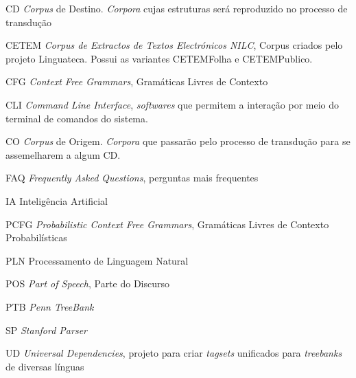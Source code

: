 \begin{siglas}  
    \item [CD] \textit{Corpus} de Destino. \textit{Corpora} cujas estruturas será reproduzido no processo de transdução
    \item[CETEM] \textit{Corpus de Extractos de Textos Electrónicos NILC}, Corpus criados pelo projeto Linguateca. Possui as variantes CETEMFolha e CETEMPublico.
    \item[CFG] \textit{Context Free Grammars}, Gramáticas Livres de Contexto
    \item[CLI] \textit{Command Line Interface}, \textit{softwares} que permitem a interação por meio do terminal de comandos do sistema.
    \item[CO] \textit{Corpus} de Origem. \textit{Corpora} que passarão pelo processo de transdução para se assemelharem a algum CD.
    \item[FAQ] \textit{Frequently Asked Questions}, perguntas mais frequentes
    \item[IA] Inteligência Artificial
    \item[PCFG] \textit{Probabilistic Context Free Grammars}, Gramáticas Livres de Contexto Probabilísticas
    \item[PLN] Processamento de Linguagem Natural
    \item[POS] \textit{Part of Speech}, Parte do Discurso
    \item[PTB] \textit{Penn TreeBank}
    \item[SP] \textit{Stanford Parser}
    \item[UD] \textit{Universal Dependencies}, projeto para criar \textit{tagsets} unificados para \textit{treebanks} de diversas línguas
  
\end{siglas}